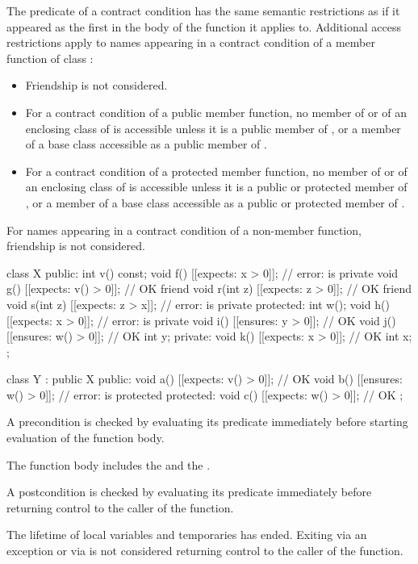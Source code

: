 \pnum
The predicate of a contract condition has the same semantic restrictions
as if it appeared as the first 
in the body of the function it applies to.
Additional access restrictions apply to names appearing in
a contract condition of a member function of class :
\begin{itemize}
\item Friendship is not considered.
\item For a contract condition of a public member function,
no member of  or of an enclosing class of  is accessible
unless it is a public member of ,
or a member of a base class
accessible as a public member of .
\item For a contract condition of a protected member function,
no member of  or of an enclosing class of  is accessible
unless it is a public or protected member of ,
or a member of a base class
accessible as a public or protected member of .
\end{itemize}
For names appearing in a contract condition of a non-member function,
friendship is not considered.
\begin{example}
\begin{codeblock}
class X {
public:
  int v() const;
  void f() [[expects: x > 0]];                  // error:  is private
  void g() [[expects: v() > 0]];                // OK
  friend void r(int z) [[expects: z > 0]];      // OK
  friend void s(int z) [[expects: z > x]];      // error:  is private
protected:
  int w();
  void h() [[expects: x > 0]];                  // error:  is private
  void i() [[ensures: y > 0]];                  // OK
  void j() [[ensures: w() > 0]];                // OK
  int y;
private:
  void k() [[expects: x > 0]];                  // OK
  int x;
};

class Y : public X {
public:
  void a() [[expects: v() > 0]];                // OK
  void b() [[ensures: w() > 0]];                // error:  is protected
protected:
  void c() [[expects: w() > 0]];                // OK
};
\end{codeblock}
\end{example}

\pnum
A precondition is checked by evaluating its predicate
immediately before starting evaluation of the function body.
\begin{note}
The function body includes
the  and
the .
\end{note}
A postcondition is checked by evaluating its predicate
immediately before returning control to the caller of the function.
\begin{note}
The lifetime of local variables and temporaries has ended.
Exiting via an exception or via 
is not considered returning control to the caller of the function.
\end{note}

